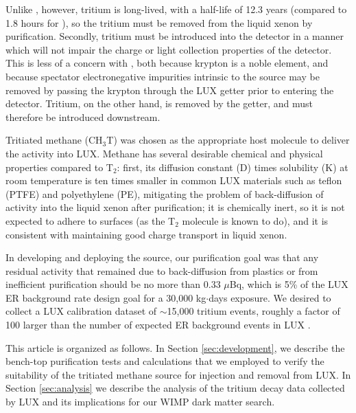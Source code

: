 Unlike \krsrc, however, tritium is long-lived, with a half-life of 12.3 years\cite{Tritium_halflife_all} (compared to 1.8 hours for \krsrc), so the tritium must be removed from the liquid xenon by purification. Secondly, tritium must be introduced into the detector in a manner which will not impair the charge or light collection properties of the detector. This is less of a concern with \krsrc, both because krypton is a noble element, and because spectator electronegative impurities intrinsic to the source may be removed by passing the krypton through the LUX getter prior to entering the detector. Tritium, on the other hand, is removed by the getter, and must therefore be introduced downstream.

Tritiated methane (CH$_3$T) was chosen as the appropriate host molecule to deliver the activity into LUX. Methane has several desirable chemical and physical properties compared to T$_2$: first, its diffusion constant (D) times solubility (K) at room temperature is ten times smaller in common LUX materials such as teflon (PTFE) and polyethylene (PE)\cite{miyake:1983}, mitigating the problem of back-diffusion of activity into the liquid xenon after purification; it is chemically inert, so it is not expected to adhere to surfaces (as the T$_2$ molecule is known to do), and it is consistent with maintaining good charge transport in liquid xenon.

In developing and deploying the source, our purification goal was that any residual activity that remained due to back-diffusion from plastics or from inefficient purification should be no more than 0.33 $\mu$Bq, which is 5\% of the LUX ER background rate design goal for a 30,000 kg$\cdot$days exposure. We desired to collect a LUX calibration dataset of $\sim$15,000 tritium events, roughly a factor of 100 larger than the number of expected ER background events in LUX \cite{LUX_BG} . 

This article is organized as follows. In Section \ref{sec:development}, we describe the bench-top purification tests and calculations that we employed to verify the suitability of the tritiated methane source for injection and removal from LUX. In Section \ref{sec:analysis} we describe the analysis of the tritium decay data collected by LUX and its implications for our WIMP dark matter search.



